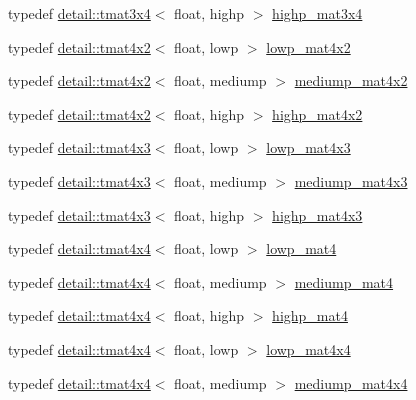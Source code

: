\begin{DoxyCompactItemize}
\item 
typedef \hyperlink{structglm_1_1detail_1_1tmat3x4}{detail\+::tmat3x4}$<$ float, highp $>$ \hyperlink{group__core__precision_gabaf9c8dd35db715b1093042703f879d0}{highp\+\_\+mat3x4}
\item 
typedef \hyperlink{structglm_1_1detail_1_1tmat4x2}{detail\+::tmat4x2}$<$ float, lowp $>$ \hyperlink{group__core__precision_ga2cfe24ae14da17f3510acfc3d03e05a5}{lowp\+\_\+mat4x2}
\item 
typedef \hyperlink{structglm_1_1detail_1_1tmat4x2}{detail\+::tmat4x2}$<$ float, mediump $>$ \hyperlink{group__core__precision_ga5ade2a6a65653683f76988c45da39f15}{mediump\+\_\+mat4x2}
\item 
typedef \hyperlink{structglm_1_1detail_1_1tmat4x2}{detail\+::tmat4x2}$<$ float, highp $>$ \hyperlink{group__core__precision_gadf9c4a7947c2b0a79f52cc86a860f270}{highp\+\_\+mat4x2}
\item 
typedef \hyperlink{structglm_1_1detail_1_1tmat4x3}{detail\+::tmat4x3}$<$ float, lowp $>$ \hyperlink{group__core__precision_gada92d0baf15002240dd6f638c57f9fec}{lowp\+\_\+mat4x3}
\item 
typedef \hyperlink{structglm_1_1detail_1_1tmat4x3}{detail\+::tmat4x3}$<$ float, mediump $>$ \hyperlink{group__core__precision_ga445d8aac3a5227af2d1e98d5c2f74d03}{mediump\+\_\+mat4x3}
\item 
typedef \hyperlink{structglm_1_1detail_1_1tmat4x3}{detail\+::tmat4x3}$<$ float, highp $>$ \hyperlink{group__core__precision_gab8dfe989c5100c35ab5dec0e94f59d2a}{highp\+\_\+mat4x3}
\item 
typedef \hyperlink{structglm_1_1detail_1_1tmat4x4}{detail\+::tmat4x4}$<$ float, lowp $>$ \hyperlink{group__core__precision_ga8f6fef75ce51e9d6db7971478ad1f1c2}{lowp\+\_\+mat4}
\item 
typedef \hyperlink{structglm_1_1detail_1_1tmat4x4}{detail\+::tmat4x4}$<$ float, mediump $>$ \hyperlink{group__core__precision_gaf3de9a0400cf707d3c159f32902b92db}{mediump\+\_\+mat4}
\item 
typedef \hyperlink{structglm_1_1detail_1_1tmat4x4}{detail\+::tmat4x4}$<$ float, highp $>$ \hyperlink{group__core__precision_ga3067b3b8ce793227a51b2e3c233257d5}{highp\+\_\+mat4}
\item 
typedef \hyperlink{structglm_1_1detail_1_1tmat4x4}{detail\+::tmat4x4}$<$ float, lowp $>$ \hyperlink{group__core__precision_gad31846a0565c22a0479950313c28b218}{lowp\+\_\+mat4x4}
\item 
typedef \hyperlink{structglm_1_1detail_1_1tmat4x4}{detail\+::tmat4x4}$<$ float, mediump $>$ \hyperlink{group__core__precision_gacb51d2d10f7607617ac544f6db9a6eef}{mediump\+\_\+mat4x4}

\end{DoxyCompactItemize}
